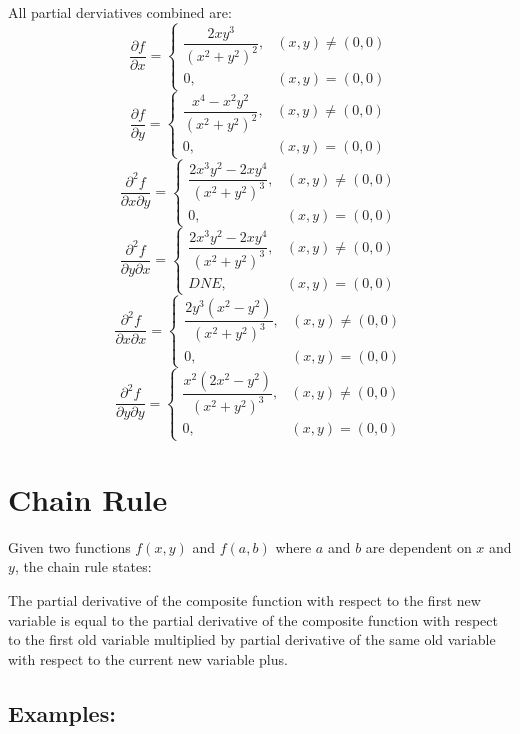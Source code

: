 \documentclass[a4paper,12pt,openany]{book}
\newcommand{\pd}[2]{\dfrac{\partial #1}{\partial #2}}
\newcommand{\pdm}[3]{\dfrac{\partial^2 #1}{\partial #2 \partial #3}}
\begin{document}
All partial derviatives combined are:
\[
    \pd{f}{x} = 
    \begin{cases}
        \dfrac{2xy^3}{(x^2 + y^2)^2}, & (x, y) \neq (0, 0)\\
        0, & (x, y) = (0, 0)
    \end{cases}
\]
\[
    \pd{f}{y} = 
    \begin{cases}
        \dfrac{x^4 - x^2 y^2}{(x^2 + y^2)^2}, & (x, y) \neq (0, 0)\\
        0, & (x, y) = (0, 0)
    \end{cases}
\]
\[
    \pdm{f}{x}{y} = 
    \begin{cases}
        \dfrac{2x^3 y^2 - 2x y^4}{(x^2 + y^2)^3}, & (x, y) \neq (0, 0)\\
        0, & (x, y) = (0, 0)
    \end{cases}
\]
\[
    \pdm{f}{y}{x} = 
    \begin{cases}
        \dfrac{2x^3 y^2 - 2x y^4}{(x^2 + y^2)^3}, & (x, y) \neq (0, 0)\\
        DNE, & (x, y) = (0, 0)
    \end{cases}
\]
\[
    \pdm{f}{x}{x} = 
    \begin{cases}
        \dfrac{2y^3(x^2 - y^2)}{(x^2 + y^2)^3}, & (x, y) \neq (0, 0)\\
        0, & (x, y) = (0, 0)
    \end{cases}
\]
\[
    \pdm{f}{y}{y} = 
    \begin{cases}
        \dfrac{x^2(2x^2 - y^2)}{(x^2 + y^2)^3}, & (x, y) \neq (0, 0)\\
        0, & (x, y) = (0, 0)
    \end{cases}
\]

\section{Chain Rule}

Given two functions \(f(x, y)\) and \(f(a, b)\) where $a$ and $b$ are dependent on $x$ and $y$, the chain rule states:

The partial derivative of the composite function with respect to the first new variable is equal to the partial derivative of the composite function with respect to the first old variable multiplied by partial derivative of the same old variable with respect to the current new variable plus.

\subsection{Examples:}
\end{document}
